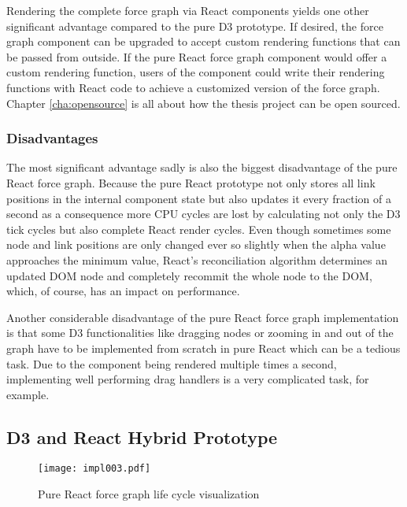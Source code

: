 Rendering the complete force graph via React components yields one other significant advantage compared to the pure D3 prototype. If desired, the force graph component can be upgraded to accept custom rendering functions that can be passed from outside. If the pure React force graph component would offer a custom rendering function, users of the component could write their rendering functions with React code to achieve a customized version of the force graph. Chapter \ref{cha:opensource} is all about how the thesis project can be open sourced.

\subsubsection{Disadvantages}

The most significant advantage sadly is also the biggest disadvantage of the pure React force graph. Because the pure React prototype not only stores all link positions in the internal component state but also updates it every fraction of a second as a consequence more CPU cycles are lost by calculating not only the D3 tick cycles but also complete React render cycles. Even though sometimes some node and link positions are only changed ever so slightly when the alpha value approaches the minimum value, React's reconciliation algorithm determines an updated DOM node and completely recommit the whole node to the DOM, which, of course, has an impact on performance.

Another considerable disadvantage of the pure React force graph implementation is that some D3 functionalities like dragging nodes or zooming in and out of the graph have to be implemented from scratch in pure React which can be a tedious task. Due to the component being rendered multiple times a second, implementing well performing drag handlers is a very complicated task, for example.


\subsection{D3 and React Hybrid Prototype}
\label{sub:D3AndReactHybrid}

\begin{figure}
\centering
\texttt{[image: impl003.pdf]}
\caption{Pure React force graph life cycle visualization}
\label{fig:reactD3HybridLifeCycle}
\end{figure}

